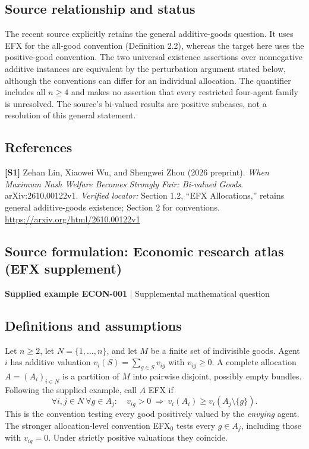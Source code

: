 \documentclass[11pt,a4paper]{article}
\begin{document}
\subsection*{Source relationship and status}
The recent source explicitly retains the general additive-goods question. It uses EFX for the all-good convention (Definition 2.2), whereas the target here uses the positive-good convention. The two universal existence assertions over nonnegative additive instances are equivalent by the perturbation argument stated below, although the conventions can differ for an individual allocation. The quantifier includes all $n\geq4$ and makes no assertion that every restricted four-agent family is unresolved. The source's bi-valued results are positive subcases, not a resolution of this general statement.
\subsection*{References}
\begingroup\footnotesize\raggedright
\textbf{[S1]} Zehan Lin, Xiaowei Wu, and Shengwei Zhou (2026 preprint). \emph{When Maximum Nash Welfare Becomes Strongly Fair: Bi-valued Goods}. arXiv:2610.00122v1. \textit{Verified locator:} Section 1.2, ``EFX Allocations,'' retains general additive-goods existence; Section 2 for conventions. \url{https://arxiv.org/html/2610.00122v1}
\par\endgroup

\subsection*{Source formulation: Economic research atlas (EFX supplement)}
\label{atlas:app:efx}
{\sffamily\small\color{muted}\textbf{Supplied example ECON-001} | Supplemental mathematical question\par}
\subsection*{Definitions and assumptions}
Let $n\geq2$, let $N=\{1,\ldots,n\}$, and let $M$ be a finite set of indivisible goods. Agent $i$ has additive valuation $v_i(S)=\sum_{g\in S}v_{ig}$ with $v_{ig}\geq0$. A complete allocation $A=(A_i)_{i\in N}$ is a partition of $M$ into pairwise disjoint, possibly empty bundles. Following the supplied example, call $A$ EFX if
\[
\forall i,j\in N\ \forall g\in A_j:\quad
v_{ig}>0\ \Longrightarrow\ v_i(A_i)\geq v_i(A_j\setminus\{g\}).
\]
This is the convention testing every good positively valued by the \emph{envying} agent. The stronger allocation-level convention EFX$_0$ tests every $g\in A_j$, including those with $v_{ig}=0$. Under strictly positive valuations they coincide.
\end{document}
